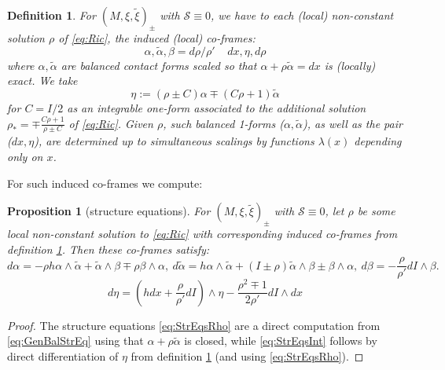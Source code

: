 \documentclass[10pt]{amsart}
\newtheorem{prop}[thm]{Proposition}
\theoremstyle{definition}
\newtheorem{dfn}{Definition}
\begin{document}
\begin{dfn}\label{def:SchwCofr}
    {\em For $(M, \xi, \tilde \xi)_\pm$ with $\mathcal{S}\equiv 0$, we have to each (local) non-constant solution $\rho$ of \eqref{eq:Ric}, the {\em induced} (local) co-frames:
    \[ \alpha, \tilde\alpha, \beta = d\rho/\rho' ~~~~~ dx, \eta, d\rho \]
    where $\alpha, \tilde\alpha$ are balanced contact forms scaled so that $\alpha + \rho \tilde\alpha = dx$ is (locally) exact. We take 
    \[\eta := (\rho \pm C)\alpha \mp (C\rho + 1)\tilde\alpha\] for $C= I/2$ as an integrable one-form associated to the additional solution $\rho_* = \mp \frac{C\rho + 1}{\rho \pm C}$ of \eqref{eq:Ric}. Given $\rho$, such balanced 1-forms ($\alpha, \tilde\alpha$), as well as the pair ($dx, \eta$), are determined up to simultaneous scalings by functions $\lambda(x)$ depending only on $x$.}
\end{dfn}

For such induced co-frames we compute:

\begin{prop}[structure equations]
    For $(M, \xi, \tilde \xi)_\pm$ with $\mathcal{S}\equiv 0$,  let $\rho$ be some local non-constant solution to \eqref{eq:Ric} with corresponding induced co-frames  from definition \ref{def:SchwCofr}. Then these co-frames satisfy:
    \begin{equation}\label{eq:StrEqsRho}
         d\alpha = -\rho h \alpha\wedge \tilde\alpha + \tilde\alpha \wedge\beta  \mp \rho \beta\wedge\alpha , ~d\tilde\alpha =  h \alpha\wedge \tilde\alpha + (I \pm \rho ) \tilde\alpha \wedge\beta \pm \beta\wedge\alpha , ~d\beta = - \frac{\rho}{\rho'} dI\wedge \beta.
    \end{equation}
    \begin{equation}\label{eq:StrEqsInt}
        d\eta = \left( h dx + \frac{\rho}{\rho'} dI\right) \wedge\eta - \frac{\rho^2\mp 1 }{2\rho'} dI\wedge dx
    \end{equation}
    
\end{prop}

\begin{proof}
    The structure equations \eqref{eq:StrEqsRho} are a direct computation from \eqref{eq:GenBalStrEq} using that $\alpha + \rho\tilde\alpha$ is closed, while \eqref{eq:StrEqsInt} follows by direct differentiation of $\eta$ from definition \ref{def:SchwCofr} (and using \eqref{eq:StrEqsRho}).
\end{proof}
\end{document}
